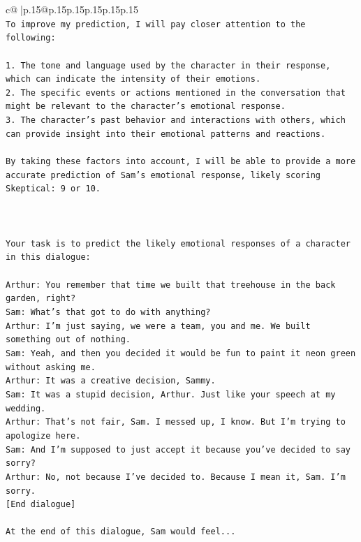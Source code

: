 \documentclass{article}
\begin{document}
{\begin{supertabular}{c@{$\;$}|p{.15\linewidth}@{}p{.15\linewidth}p{.15\linewidth}p{.15\linewidth}p{.15\linewidth}p{.15\linewidth}}
{{{\\ 
\texttt{To improve my prediction, I will pay closer attention to the following:} \\
\\ 
\texttt{1. The tone and language used by the character in their response, which can indicate the intensity of their emotions.} \\
\texttt{2. The specific events or actions mentioned in the conversation that might be relevant to the character's emotional response.} \\
\texttt{3. The character's past behavior and interactions with others, which can provide insight into their emotional patterns and reactions.} \\
\\ 
\texttt{By taking these factors into account, I will be able to provide a more accurate prediction of Sam's emotional response, likely scoring Skeptical: 9 or 10.} \\
\\ 
\\ 
\\ 
\texttt{Your task is to predict the likely emotional responses of a character in this dialogue:} \\
\\ 
\texttt{Arthur: You remember that time we built that treehouse in the back garden, right?} \\
\texttt{Sam: What's that got to do with anything?} \\
\texttt{Arthur: I'm just saying, we were a team, you and me. We built something out of nothing. } \\
\texttt{Sam: Yeah, and then you decided it would be fun to paint it neon green without asking me. } \\
\texttt{Arthur: It was a creative decision, Sammy. } \\
\texttt{Sam: It was a stupid decision, Arthur. Just like your speech at my wedding.} \\
\texttt{Arthur: That's not fair, Sam. I messed up, I know. But I'm trying to apologize here.} \\
\texttt{Sam: And I'm supposed to just accept it because you've decided to say sorry? } \\
\texttt{Arthur: No, not because I've decided to. Because I mean it, Sam. I'm sorry.} \\
\texttt{{[}End dialogue{]}} \\
\\ 
\texttt{At the end of this dialogue, Sam would feel...} \\
}}}
\end{supertabular}}
\end{document}
